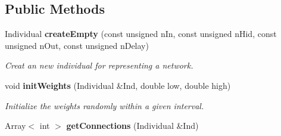 \subsection*{Public Methods}
\begin{CompactItemize}
\item 
Individual {\bf create\-Empty} (const unsigned n\-In, const unsigned n\-Hid, const unsigned n\-Out, const unsigned n\-Delay)
\begin{CompactList}\small\item\em Creat an new individual for representing a network.\item\end{CompactList}\item 
void {\bf init\-Weights} (Individual \&Ind, double low, double high)
\begin{CompactList}\small\item\em Initialize the weights randomly within a given interval.\item\end{CompactList}\item 
{}
Array$<$ int $>$ {\bf get\-Connections} (Individual \&Ind)\label{classOps__Basic_a2}


\end{CompactItemize}
